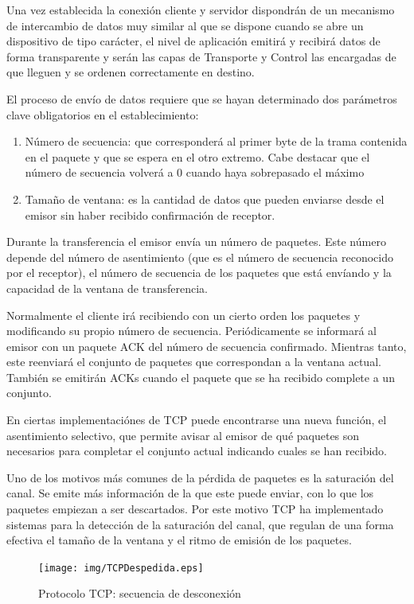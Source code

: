 \documentclass[a4paper,spanish,12pt]{book}
\begin{document}
Una vez establecida la conexión cliente y servidor dispondrán de un mecanismo de intercambio de datos muy similar al que se dispone cuando se abre un dispositivo de tipo carácter, el nivel de aplicación emitirá y recibirá datos de forma transparente y serán las capas de Transporte y Control las encargadas de que lleguen y se ordenen correctamente en destino.


El proceso de envío de datos requiere que se hayan determinado dos parámetros clave obligatorios en el establecimiento:
\begin{enumerate}
	\item{Número de secuencia: que corresponderá al primer byte de la trama contenida en el paquete y que se espera en el otro extremo. Cabe destacar que el número de secuencia volverá a 0 cuando haya sobrepasado el máximo}
	\item{Tamaño de ventana: es la cantidad de datos que pueden enviarse desde el emisor sin haber recibido confirmación de receptor.}
\end{enumerate}

Durante la transferencia el emisor envía un número de paquetes. Este número depende del número de asentimiento (que es el número de secuencia reconocido por el receptor), el número de secuencia de los paquetes que está envíando y la capacidad de la ventana de transferencia.

Normalmente el cliente irá recibiendo con un cierto orden los paquetes y modificando su propio número de secuencia. Periódicamente se informará al emisor con un paquete ACK del número de secuencia confirmado. Mientras tanto, este reenviará el conjunto de paquetes que correspondan a la ventana actual. Tambi\'en se emitirán ACKs cuando el paquete que se ha recibido complete a un conjunto.

En ciertas implementaciónes de TCP puede encontrarse una nueva función, el asentimiento selectivo, que permite avisar al emisor de qué paquetes son necesarios para completar el conjunto actual indicando cuales se han recibido.

Uno de los motivos más comunes de la pérdida de paquetes es la saturación del canal. Se emite más información de la que este puede enviar, con lo que los paquetes empiezan a ser descartados. Por este motivo TCP ha implementado sistemas para la detección de la saturación del canal, que regulan de una forma efectiva el tamaño de la ventana y el ritmo de emisión de los paquetes.

\begin{figure}
	\texttt{[image: img/TCPDespedida.eps]}	
              \caption{Protocolo TCP: secuencia de desconexión}
  \label{fig:TCPDespedida}
\end{figure}
\end{document}
